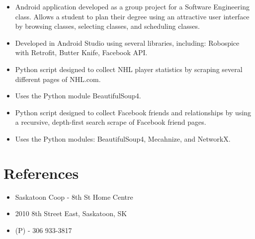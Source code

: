 \documentclass[11pt,letterpaper,sans]{moderncv}        %
\begin{document}

{
  \begin{itemize}
    \item Android application developed as a group project for a Software Engineering class. Allows a student to plan their degree using an attractive user interface by browsing classes, selecting classes, and scheduling classes.
    \item Developed in Android Studio using several libraries, including: Robospice with Retrofit, Butter Knife, Facebook API.
  \end{itemize}
}
{
  \begin{itemize}
    \item Python script designed to collect NHL player statistics by scraping several different pages of NHL.com.
    \item Uses the Python module BeautifulSoup4.
  \end{itemize}
}
{
  \begin{itemize}
    \item Python script designed to collect Facebook friends and relationships by using a recursive, depth-first search scrape of Facebook friend pages.
    \item Uses the Python modules: BeautifulSoup4, Mecahnize, and NetworkX.
  \end{itemize}
}


\section{References}
{
  \begin{itemize}
    \item Saskatoon Coop - 8th St Home Centre
    \item 2010 8th Street East, Saskatoon, SK
    \item (P) - 306 933-3817
  \end{itemize}
}
\end{document}
